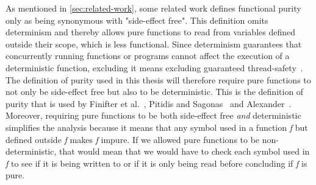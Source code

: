 \documentclass[a4paper,12pt]{article}
\begin{document}
As mentioned in \autoref{sec:related-work}, some related work defines functional purity only as being synonymous with "side-effect free". This definition omits determinism and thereby allows pure functions to read from variables defined outside their scope, which is less functional. Since determinism guarantees that concurrently running functions or programs cannot affect the execution of a deterministic function, excluding it means excluding guaranteed thread-safety~\cite{purity-in-java}. The definition of purity used in this thesis will therefore require pure functions to not only be side-effect free but also to be deterministic. This is the definition of purity that is used by Finifter et al.~\cite{purity-in-java}, Pitidis and Sagonas~\cite{pitidis2010purity} and Alexander~\cite{alvin-alexander}. %
Moreover, requiring pure functions to be both side-effect free \textit{and} deterministic simplifies the analysis because it means that any symbol used in a function \textit{f} but defined outside \textit{f} makes \textit{f} impure. If we allowed pure functions to be non-deterministic, that would mean that we would have to check each symbol used in \textit{f} to see if it is being written to or if it is only being read before concluding if \textit{f} is pure.




\end{document}
